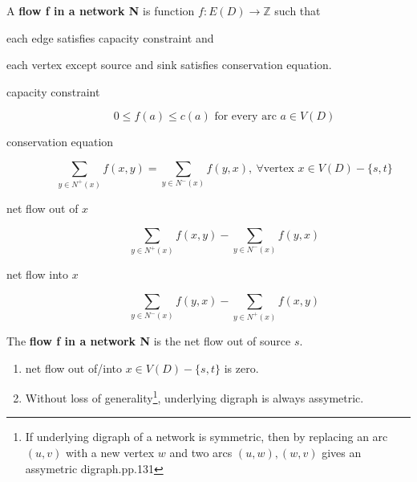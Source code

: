 \begin{definition}
	A \textbf{flow f in a network N} is function $f : E(D) \to \mathbb{Z}$ such that
	\begin{enumerate*}
		\item each edge satisfies capacity constraint and
		\item each vertex except source and sink satisfies conservation equation.
	\end{enumerate*}
\end{definition}

\begin{description}
	\item[capacity constraint] 
		\begin{equation}
		0 \le f(a) \le c(a) \text{ for every arc }a \in V(D)
		\end{equation}
	\item[conservation equation] 
		\begin{equation}
			\sum_{y \in N^+(x)} f(x,y) = \sum_{y \in N^-(x)} f(y,x),\ \forall \text{vertex } x \in V(D)-\{s,t\}
		\label{equ:conservation}
		\end{equation}
	\item[net flow out of $x$]
		\[ \sum_{y \in N^+(x)} f(x,y) - \sum_{y \in N^-(x)} f(y,x) \]
	\item[net flow into $x$]
		\[ \sum_{y \in N^-(x)} f(y,x) - \sum_{y \in N^+(x)} f(x,y) \]
\end{description}

\begin{definition}
	The \textbf{flow f in a network N} is the net flow out of source $s$.
\end{definition}

\begin{remark}
	\begin{enumerate}
		\item net flow out of/into $x \in V(D)-\{s,t\}$ is zero.
		\item Without loss of generality\footnote{If underlying digraph of a network is symmetric, then by replacing an arc $(u,v)$ with a new vertex $w$ and two arcs $(u,w),(w,v)$ gives an assymetric digraph.\cite{chartrand}pp.131}, underlying digraph is always assymetric.
	\end{enumerate}
\end{remark}

